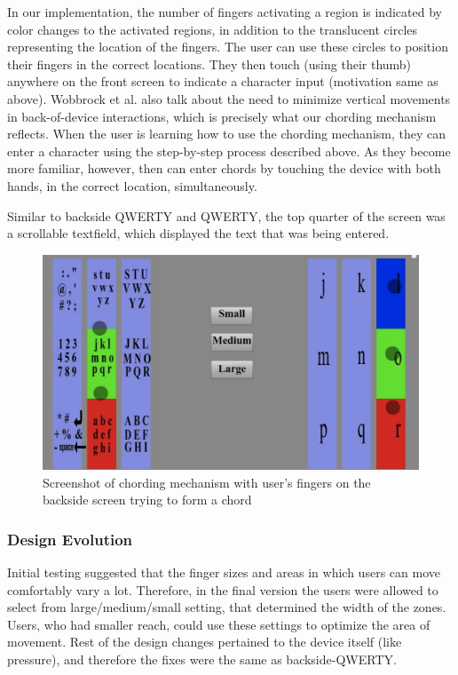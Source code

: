 In our implementation, the number of fingers activating a region is indicated by color changes to the activated regions, in addition to the translucent circles representing the location of the fingers. The user can use these circles to position their fingers in the correct locations. They then touch (using their thumb) anywhere on the front screen to indicate a character input (motivation same as above). Wobbrock et al. also talk about the need to minimize vertical movements in back-of-device interactions, which is precisely what our chording mechanism reflects. When the user is learning how to use the chording mechanism, they can enter a character using the step-by-step process described above.  As they become more familiar, however, then can enter chords by touching the device with both hands, in the correct location, simultaneously.

Similar to backside QWERTY and QWERTY, the top quarter of the screen was a scrollable textfield, which displayed the text that was being entered.

\begin{figure}
    \includegraphics[scale=0.45]{Figures/chording.pdf} 
    \caption{Screenshot of chording mechanism with user's fingers on
      the backside screen trying to form a chord}
\end{figure} 
\subsubsection{Design Evolution}

Initial testing suggested that the finger sizes and areas in which users can move comfortably vary a lot. Therefore, in the final version the users were allowed to select from large/medium/small setting, that determined the width of the zones. Users, who had smaller reach, could use these settings to optimize the area of movement. Rest of the design changes pertained to the device itself (like pressure), and therefore the fixes were the same as backside-QWERTY.
